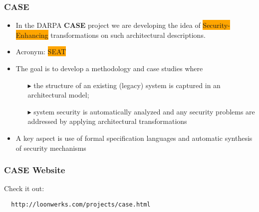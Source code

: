 \documentclass{beamer}
\newcommand{\kemph}[1]{\colorbox{orange}{#1}}
\begin{document}
\begin{frame}\frametitle{CASE}
\begin{itemize}

\item In the DARPA \textbf{CASE} project we are developing the idea of
  \kemph{Security-Enhancing} transformations on such architectural
  descriptions.

\item Acronym: \colorbox{orange}{SEAT}

\item The goal is to develop a methodology and case studies where
  \begin{itemize}
  \item [$\blacktriangleright$]
       the structure of an existing (legacy) system is captured in an architectural model;

 \item [$\blacktriangleright$] system security is automatically analyzed and any security
   problems are addressed by applying architectural transformations
 \end{itemize}

\item A key aspect is use of formal specification languages and
  automatic synthesis of security mechanisms

\end{itemize}

\end{frame}

\begin{frame}[fragile]\frametitle{CASE Website}

Check it out:

\begin{verbatim}
  http://loonwerks.com/projects/case.html
\end{verbatim}

\end{frame}



\end{document}
